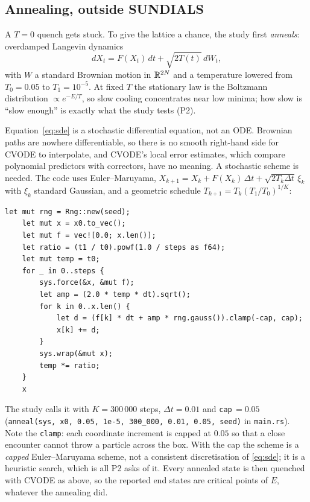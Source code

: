\subsection{Annealing, outside SUNDIALS}
A $T=0$ quench gets stuck. To give the lattice a chance, the study first \emph{anneals}: overdamped Langevin dynamics
\begin{equation}\label{eq:sde}
dX_t=F(X_t)\,dt+\sqrt{2T(t)}\,dW_t,
\end{equation}
with $W$ a standard Brownian motion in $\mathbb{R}^{2N}$ and a temperature lowered from $T_0=0.05$ to $T_1=10^{-5}$. At fixed
$T$ the stationary law is the Boltzmann distribution $\propto e^{-E/T}$, so slow cooling concentrates near low
minima; how slow is ``slow enough'' is exactly what the study tests (P2).

Equation~\eqref{eq:sde} is a stochastic differential equation, not an ODE. Brownian paths are nowhere differentiable,
so there is no smooth right-hand side for CVODE to interpolate, and CVODE's local error estimates, which compare
polynomial predictors with correctors, have no meaning. A stochastic scheme is needed. The code uses Euler--Maruyama,
$X_{k+1}=X_k+F(X_k)\,\Delta t+\sqrt{2T_k\Delta t}\,\xi_k$ with $\xi_k$ standard Gaussian, and a geometric schedule
$T_{k+1}=T_k(T_1/T_0)^{1/K}$:
\begin{lstlisting}[language={},title={lib.rs, lines 488--503}]
    let mut rng = Rng::new(seed);
    let mut x = x0.to_vec();
    let mut f = vec![0.0; x.len()];
    let ratio = (t1 / t0).powf(1.0 / steps as f64);
    let mut temp = t0;
    for _ in 0..steps {
        sys.force(&x, &mut f);
        let amp = (2.0 * temp * dt).sqrt();
        for k in 0..x.len() {
            let d = (f[k] * dt + amp * rng.gauss()).clamp(-cap, cap);
            x[k] += d;
        }
        sys.wrap(&mut x);
        temp *= ratio;
    }
    x
\end{lstlisting}
The study calls it with $K=300\,000$ steps, $\Delta t=0.01$ and \texttt{cap}$\,=0.05$
(\texttt{anneal(sys, x0, 0.05, 1e-5, 300\_000, 0.01, 0.05, seed)} in \texttt{main.rs}). Note the \texttt{clamp}: each
coordinate increment is capped at $0.05$ so that a close encounter cannot throw a particle across the box. With the cap
the scheme is a \emph{capped} Euler--Maruyama scheme, not a consistent discretisation of \eqref{eq:sde}; it is a
heuristic search, which is all P2 asks of it. Every annealed state is then quenched with CVODE as above, so the
reported end states are critical points of $E$, whatever the annealing did.

